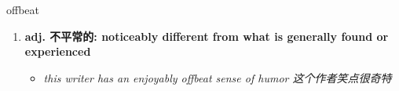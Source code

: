 
\begin{frame}
{\huge offbeat}
\begin{center}
\begin{enumerate}\Large
  \item \textbf{adj. 不平常的: noticeably different from what is generally found or experienced}
  \begin{itemize}
    \item \em{\Large{this writer has an enjoyably offbeat sense of humor 这个作者笑点很奇特}}
  \end{itemize}
\end{enumerate}
\end{center}
\end{frame}
